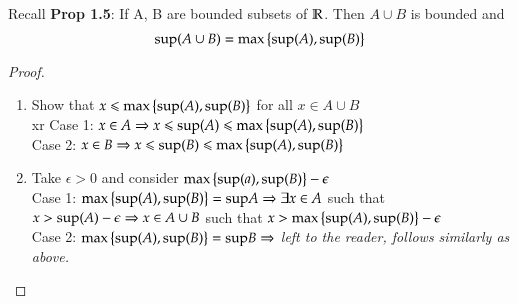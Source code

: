 
Recall \textbf{Prop 1.5}: 	If A, B are bounded subsets of $\mathbb{R}$. Then $A\cup B$ is bounded and
\[\mathrm{sup}(A\cup B) = \mathrm{max}\left\{ \mathrm{sup}(A), \mathrm{sup}(B) \right\}\]

\begin{proof}
  \begin{enumerate}[1]
    \item Show that $x \leqslant \mathrm{max}\left\{ \mathrm{sup}(A), \mathrm{sup}(B) \right\}$ for all $x\in A\cup B$ \\xr
    Case 1: $x\in A \Rightarrow x \leqslant \mathrm{sup}(A) \leqslant \mathrm{max}\left\{ \mathrm{sup}(A),\mathrm{sup}(B) \right\}$ \\
    Case 2: $x\in B \Rightarrow x \leqslant \mathrm{sup}(B) \leqslant \mathrm{max}\left\{ \mathrm{sup}(A),\mathrm{sup}(B) \right\}$

    \item Take $\epsilon > 0$ and consider $\mathrm{max}\left\{ \mathrm{sup}(a), \mathrm{sup}(B) \right\}-\epsilon$ \\
    Case 1: $\mathrm{max}\left\{ \mathrm{sup}(A), \mathrm{sup}(B) \right\}=\mathrm{sup} A \Rightarrow \exists x\in A$ such that $x>\mathrm{sup}(A)-\epsilon \Rightarrow x \in A\cup B $ such that $x>\mathrm{max}\left\{ \mathrm{sup}(A), \mathrm{sup}(B) \right\}-\epsilon$ \\
    Case 2: $\mathrm{max}\left\{ \mathrm{sup}(A), \mathrm{sup}(B) \right\}=\mathrm{sup} B \Rightarrow $ \textit{left to the reader, follows similarly as above. }
  \end{enumerate}
\end{proof}

